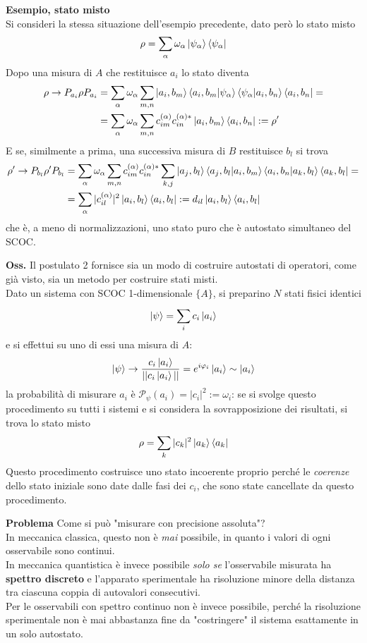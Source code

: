 \textbf{Esempio, stato misto}\\
Si consideri la stessa situazione dell'esempio precedente, dato però lo
stato misto
$$\rho = \sum_{\alpha}\omega_\alpha\ket{\psi_\alpha}\bra{\psi_\alpha}$$
Dopo una misura di $A$ che restituisce $a_i$ lo stato diventa
\begin{align*}
    \rho\rightarrow P_{a_i}\rho P_{a_i}&=
    \sum_{\alpha}\omega_\alpha\sum_{m,n}\ket{a_i,b_m}\bra{a_i,b_m}\ket{\psi_\alpha}\bra{\psi_\alpha}
    \ket{a_i,b_n}\bra{a_i,b_n}=\\
    &=\sum_{\alpha}\omega_\alpha\sum_{m,n} c_{im}^{(\alpha)}c_{in}^{(\alpha)*}\ket{a_i,b_m}\bra{a_i,b_n}:=
    \rho'
\end{align*}
E se, similmente a prima, una successiva misura di $B$ restituisce $b_l$ si trova
\begin{align*}
    \rho'\rightarrow P_{b_l}\rho'P_{b_l} &=
    \sum_{\alpha}\omega_\alpha\sum_{m,n} c_{im}^{(\alpha)}c_{in}^{(\alpha)*}\sum_{k,j}\ket{a_j,b_l}
    \bra{a_j,b_l}\ket{a_i,b_m}\bra{a_i,b_n}\ket{a_k,b_l}\bra{a_k,b_l} =\\
    &= \sum_{\alpha} |c_{il}^{(\alpha)}|^2\ket{a_i,b_l}\bra{a_i,b_l}
    := d_{il}\ket{a_i,b_l}\bra{a_i,b_l}
\end{align*}
che è, a meno di normalizzazioni, uno stato puro che è autostato simultaneo del SCOC.

\textbf{Oss.} Il postulato 2 fornisce sia un modo di costruire autostati di operatori, come già visto, sia
un metodo per costruire stati misti.\\
Dato un sistema con SCOC 1-dimensionale $\{A\}$,
si preparino $N$ stati fisici identici 
$$\ket{\psi} = \sum_{i}^{}c_i\ket{a_i}$$
e si effettui su uno di essi una misura di $A$:
$$\ket{\psi}\rightarrow \frac{c_i\ket{a_i}}{||c_i\ket{a_i}||} = e^{i\varphi_i}\ket{a_i}\sim\ket{a_i}$$
la probabilità di misurare $a_i$ è $\mathcal{P}_{\psi}(a_i)=|c_i|^2:=\omega_i$: se si svolge questo
procedimento su tutti i sistemi e si considera la sovrapposizione dei risultati, si trova lo stato misto
$$\rho = \sum_{k}|c_k|^2\ket{a_k}\bra{a_k}$$
Questo procedimento costruisce uno stato incoerente proprio perché le \textit{coerenze} dello stato
iniziale sono date dalle fasi dei $c_i$, che sono state cancellate da questo procedimento.

\textbf{Problema} Come si può "misurare con precisione assoluta"?\\
In meccanica classica, questo non è \textit{mai} possibile, in quanto i valori di ogni osservabile sono
continui.\\
In meccanica quantistica è invece possibile \textit{solo se} l'osservabile misurata ha
\textbf{spettro discreto} e l'apparato sperimentale ha risoluzione minore della distanza tra ciascuna 
coppia di autovalori consecutivi.\\
Per le osservabili con spettro continuo non è invece possibile, perché la risoluzione sperimentale non è
mai abbastanza fine da "costringere" il sistema esattamente in un solo autostato.

